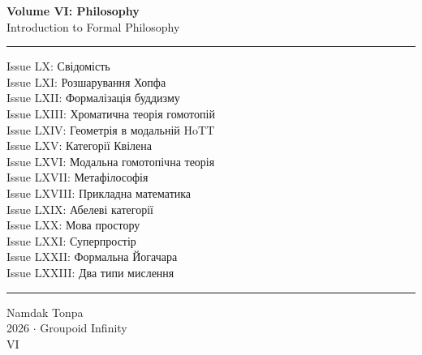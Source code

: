 \documentclass{article}
\begin{document}
\begin{titlepage}
    \centering
    \vspace*{0.5in}
    \Huge
    \textbf{Volume VI: Philosophy} \\
    \LARGE
    Introduction to Formal Philosophy \\
    \vspace{1.5in}
    \small
    \flushleft
    \vspace{-2mm} \rule{\textwidth}{0.4pt}
    Issue LX: Свідомість \\
    Issue LXI: Розшарування Хопфа \\
    Issue LXII: Формалізація буддизму \\
    Issue LXIII: Хроматична теорія гомотопій \\
    Issue LXIV: Геометрія в модальній HoTT \\
    Issue LXV: Категорії Квілена \\
    Issue LXVI: Модальна гомотопічна теорія \\
    Issue LXVII: Метафілософія \\
    Issue LXVIII: Прикладна математика \\
    Issue LXIX: Абелеві категорії \\
    Issue LXX: Мова простору \\
    Issue LXXI: Суперпростір \\
    Issue LXXII: Формальна Йогачара \\
    Issue LXXIII: Два типи мислення \\
    \vspace{-2mm} \rule{\textwidth}{0.4pt}
    \centering
    \vfill
    \large
    Namdak Tonpa \\
    \Large
    2026 $\cdot$ Groupoid Infinity \\
    VI
\end{titlepage}

\tableofcontents
\newif\ifincludeTOC














% 

\end{document}

